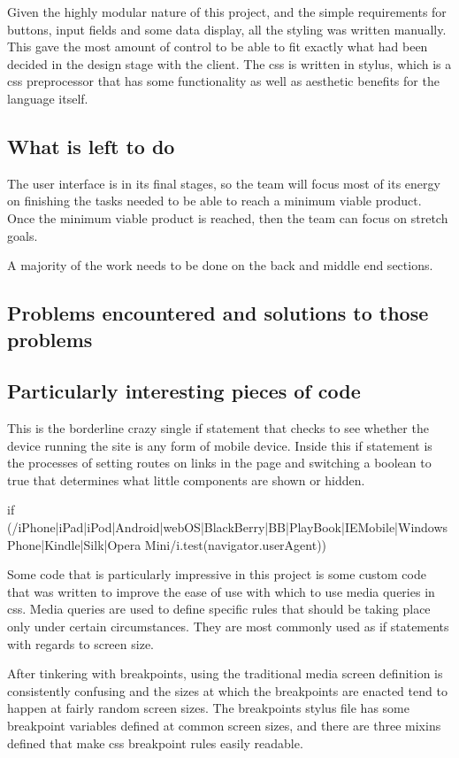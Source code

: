 \documentclass[draftclsnofoot,onecolumn,letterpaper,10pt,compsoc]{IEEEtran}
\begin{document}
Given the highly modular nature of this project, and the simple requirements for buttons, input fields and some data display, all the styling was written manually.
This gave the most amount of control to be able to fit exactly what had been decided in the design stage with the client.
The css is written in stylus, which is a css preprocessor that has some functionality as well as aesthetic benefits for the language itself.



\subsection{What is left to do}


The user interface is in its final stages, so the team will focus most of its energy on finishing the tasks needed to be able to reach a minimum viable product.
Once the minimum viable product is reached, then the team can focus on stretch goals.

A majority of the work needs to be done on the back and middle end sections.


\subsection{Problems encountered and solutions to those problems}
\subsection{Particularly interesting pieces of code}

This is the borderline crazy single if statement that checks to see whether the device running the site is any form of mobile device. Inside this if statement is the processes of setting routes on links in the page and switching a boolean to true that determines what little components are shown or hidden.

if (/iPhone|iPad|iPod|Android|webOS|BlackBerry|BB|PlayBook|IEMobile|Windows Phone|Kindle|Silk|Opera Mini/i.test(navigator.userAgent)) {}

Some code that is particularly impressive in this project is some custom code that was written to improve the ease of use with which to use media queries in css. Media queries are used to define specific rules that should be taking place only under certain circumstances. They are most commonly used as if statements with regards to screen size.

After tinkering with breakpoints, using the traditional media screen definition is consistently confusing and the sizes at which the breakpoints are enacted tend to happen at fairly random screen sizes. The breakpoints stylus file has some breakpoint variables defined at common screen sizes, and there are three mixins defined that make css breakpoint rules easily readable.
\end{document}
